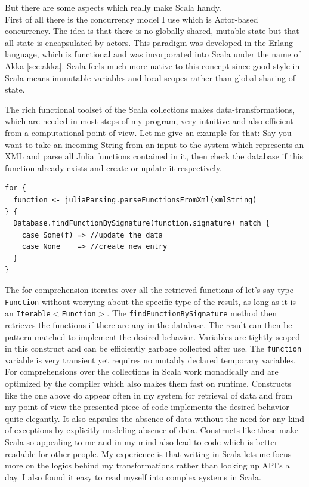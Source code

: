 \documentclass[11p]{scrartcl}
\def\code#1{\texttt{#1}}
\begin{document}
But there are some aspects which really make Scala handy.\\
First of all there is the concurrency model I use which is Actor-based concurrency. The idea is that there is no globally shared, mutable state but that all state is encapsulated by actors. This paradigm was developed in the Erlang language, which is functional and was incorporated into Scala under the name of Akka \ref{sec:akka}. Scala feels much more native to this concept since good style in Scala means immutable variables and local scopes rather than global sharing of state.

The rich functional toolset of the Scala collections makes data-transformations, which are needed in most steps of my program, very intuitive and also efficient from a computational point of view. Let me give an example for that: Say you want to take an incoming String from an input to the system which represents an XML and parse all Julia functions contained in it, then check the database if this function already exists and create or update it respectively.

\begin{verbatim}
for {
  function <- juliaParsing.parseFunctionsFromXml(xmlString)
} {
  Database.findFunctionBySignature(function.signature) match {
    case Some(f) => //update the data
    case None    => //create new entry
  }
}
\end{verbatim}

The for-comprehension iterates over all the retrieved functions of let's say type \code{Function} without worrying about the specific type of the result, as long as it is an \code{Iterable$<$Function$>$}. The \code{findFunctionBySignature} method then retrieves the functions if there are any in the database. The result can then be pattern matched to implement the desired behavior. Variables are tightly scoped in this construct and can be efficiently garbage collected after use. The \code{function} variable is very transient yet requires no mutably declared temporary variables.
For comprehensions over the collections in Scala work monadically and are optimized by the compiler which also makes them fast on runtime. Constructs like the one above do appear often in my system for retrieval of data and from my point of view the presented piece of code implements the desired behavior quite elegantly. It also capsules the absence of data without the need for any kind of exceptions by explicitly modeling absence of data. Constructs like these make Scala so appealing to me and in my mind also lead to code which is better readable for other people. My experience is that writing in Scala lets me focus more on the logics behind my transformations rather than looking up API's all day. I also found it easy to read myself into complex systems in Scala.
\end{document}
